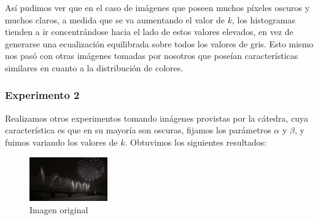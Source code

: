 \documentclass[10pt, a4paper]{article}
\begin{document}
\begin{figure}[H]
\begin{subfigure}{0.3\textwidth}
    \end{subfigure}\hfill
\end{figure}

Así pudimos ver que en el caso de imágenes que poseen muchos píxeles oscuros y muchos claros, a medida que se va aumentando el valor de $k$, los histogramas tienden a ir concentrándose hacia el lado de estos valores elevados, en vez de generarse una ecualización equilibrada sobre todos los valores de gris. Esto mismo nos pasó con otras imágenes tomadas por nosotros que poseían características similares en cuanto a la distribución de colores. 

\subsubsection{Experimento 2}

Realizamos otros experimentos tomando imágenes provistas por la cátedra, cuya característica es que en su mayoría son oscuras, fijamos los parámetros $\alpha$ y $\beta$, y fuimos variando los valores de $k$. Obtuvimos los siguientes resultados:

\begin{figure}[H]
	\centering
        \includegraphics[width=0.3\textwidth]{fireworks.jpg}
        \caption{Imagen original}
\end{figure}
\end{document}
